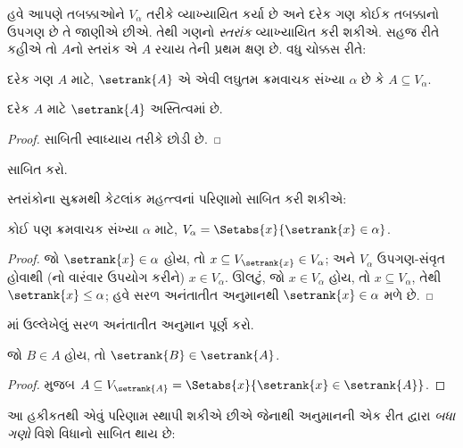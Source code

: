 \documentclass[../../../include/open-logic-section]{subfiles}
\begin{document}

હવે આપણે તબક્કાઓને $V_\alpha$ તરીકે વ્યાખ્યાયિત કર્યા છે અને
દરેક ગણ કોઈક તબક્કાનો ઉપગણ છે તે જાણીએ છીએ. તેથી ગણનો
\emph{સ્તરાંક} વ્યાખ્યાયિત કરી શકીએ. સહજ રીતે કહીએ તો
$A$નો સ્તરાંક એ $A$ રચાય તેની પ્રથમ ક્ષણ છે. વધુ ચોક્કસ રીતે:

\begin{defn}
દરેક ગણ $A$ માટે, $\setrank{A}$ એ એવી લઘુતમ ક્રમવાચક સંખ્યા
$\alpha$ છે કે $A
\subseteq V_\alpha$.
\end{defn}
\begin{prop}
	દરેક $A$ માટે $\setrank{A}$ અસ્તિત્વમાં છે.
\end{prop}
\begin{proof}
	સાબિતી સ્વાધ્યાય તરીકે છોડી છે.
\end{proof}
\begin{prob}
	 સાબિત કરો.
\end{prob}
\noindent 
સ્તરાંકોના સુક્રમથી કેટલાંક મહત્ત્વનાં પરિણામો સાબિત કરી શકીએ:
\begin{prop}
કોઈ પણ ક્રમવાચક સંખ્યા $\alpha$ માટે,
$V_\alpha = \Setabs{x}{\setrank{x} \in \alpha}$.
\end{prop}

\begin{proof}
જો $\setrank{x} \in \alpha$ હોય, તો $x \subseteq V_{\setrank{x}} \in
V_\alpha$; અને $V_\alpha$ ઉપગણ-સંવૃત હોવાથી
(નો વારંવાર ઉપયોગ કરીને)
$x \in V_\alpha$. ઊલટું, જો $x \in V_\alpha$ હોય, તો
$x \subseteq V_\alpha$, તેથી $\setrank{x} \leq \alpha$;
હવે સરળ અનંતાતીત અનુમાનથી $\setrank{x} \in \alpha$ મળે છે.
\end{proof}
\begin{prob}
	માં ઉલ્લેખેલું
	સરળ અનંતાતીત અનુમાન પૂર્ણ કરો.
\end{prob}

\begin{prop}
જો $B \in A$ હોય, તો $\setrank{B} \in \setrank{A}$.
\end{prop}

\begin{proof}
 મુજબ
$A \subseteq V_{\setrank{A}} = \Setabs{x}{\setrank{x} \in
\setrank{A}}$.
\end{proof}
\noindent
આ હકીકતથી એવું પરિણામ સ્થાપી શકીએ છીએ જેનાથી અનુમાનની
એક રીત દ્વારા \emph{બધા ગણો} વિશે વિધાનો સાબિત થાય છે:
\end{document}
